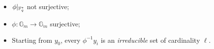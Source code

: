 \documentclass[12pt]{beamer}
\begin{document}
\begin{frame}
\begin{columns}
\begin{column}{0.6\textwidth}
\begin{center}
      \end{center}
    \end{column}
    \begin{column}{0.4\textwidth}
      \begin{itemize}
      \item<3-> $\phi|_{\mathbb{F}_q^\ast}$ not surjective;
      \item<4-> $\phi : \mathbb{G}_m \to \mathbb{G}_m$ surjective;
      \item<5-> Starting from $y_0$, every $\phi^{-1}y_i$ is an
        \emph{irreducible} set of cardinality $\ell$.
      \end{itemize}
    \end{column}
  \end{columns}
\end{frame}

\end{document}
